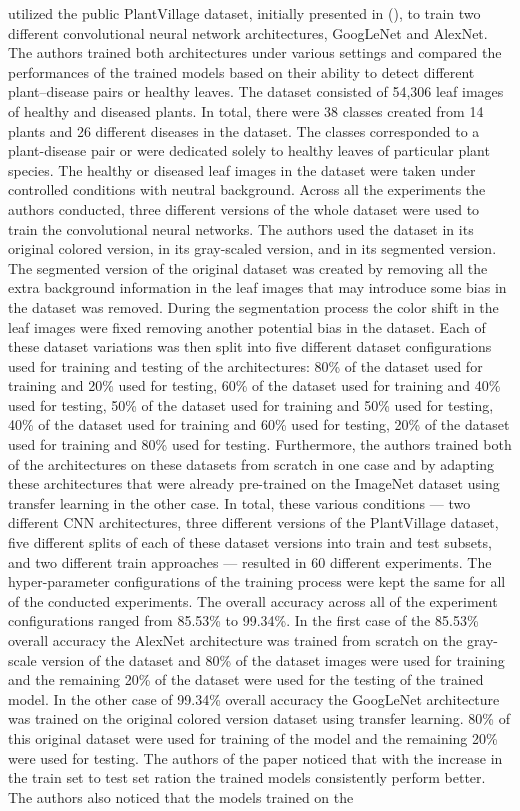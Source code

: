 \documentclass{BachelorBUI}
\begin{document}
\textcite{Mohanty:2016} utilized the public PlantVillage dataset, initially presented in (\cite{Hughes:2015}), to train two different convolutional neural network architectures, GoogLeNet and AlexNet. The authors trained both architectures under various settings and compared the performances of the trained models based on their ability to detect different plant--disease pairs or healthy leaves. The dataset consisted of 54,306 leaf images of healthy and diseased plants. In total, there were 38 classes created from 14 plants and 26 different diseases in the dataset. The classes corresponded to a plant-disease pair or were dedicated solely to healthy leaves of particular plant species. The healthy or diseased leaf images in the dataset were taken under controlled conditions with neutral background. Across all the experiments the authors conducted, three different versions of the whole dataset were used to train the convolutional neural networks. The authors used the dataset in its original colored version, in its gray-scaled version, and in its segmented version. The segmented version of the original dataset was created by removing all the extra background information in the leaf images that may introduce some bias in the dataset was removed. During the segmentation process the color shift in the leaf images were fixed removing another potential bias in the dataset. Each of these dataset variations was then split into five different dataset configurations used for training and testing of the architectures: 80\% of the dataset used for training and 20\% used for testing, 60\% of the dataset used for training and 40\% used for testing, 50\% of the dataset used for training and 50\% used for testing, 40\% of the dataset used for training and 60\% used for testing, 20\% of the dataset used for training and 80\% used for testing. Furthermore, the authors trained both of the architectures on these datasets from scratch in one case and by adapting these architectures that were already pre-trained on the ImageNet dataset using transfer learning in the other case. In total, these various conditions --- two different CNN architectures, three different versions of the PlantVillage dataset, five different splits of each of these dataset versions into train and test subsets, and two different train approaches --- resulted in 60 different experiments. The hyper-parameter configurations of the training process were kept the same for all of the conducted experiments. The overall accuracy across all of the experiment configurations ranged from 85.53\% to 99.34\%. In the first case of the 85.53\% overall accuracy the AlexNet architecture was trained from scratch on the gray-scale version of the dataset and 80\% of the dataset images were used for training and the remaining 20\% of the dataset were used for the testing of the trained model. In the other case of 99.34\% overall accuracy the GoogLeNet architecture was trained on the original colored version dataset using transfer learning. 80\% of this original dataset were used for training of the model and the remaining 20\% were used for testing. The authors of the paper noticed that with the increase in the train set to test set ration the trained models consistently perform better. The authors also noticed that the models trained on the 
\end{document}
